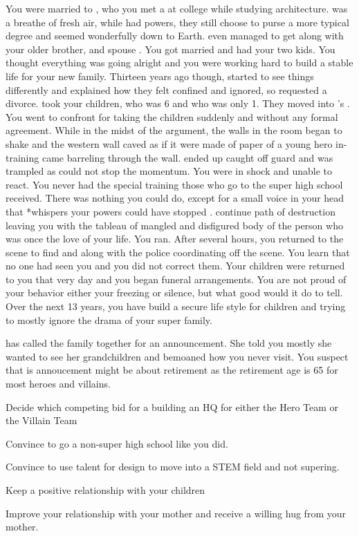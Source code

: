 \documentclass[char]{LRSguildcamp1}
\begin{document}
You were married to \cAS{}, who you met a at college while studying architecture. \cAS{} was a breathe of fresh air, while \cAS{\they} had powers, they still choose to purse a more typical degree and seemed wonderfully down to Earth. \cAS{} even managed to get along with your older brother, \cOldest{} and \cOldest{\their} spouse \cOS{}. You got married and had your two kids. You thought everything was going alright and you were working hard to build a stable life for your new family.  Thirteen years ago though, \cAS{} started to see things differently and \cAS{\they} explained how they felt confined and ignored, so requested a divorce. \cAS{} took your children, \cTeen{} who was 6 and \cTween{} who was only 1. They moved into \cOldest{}'s . You went to confront \cAS{} for taking the children suddenly and without any formal agreement.  While in the midst of the argument, the walls in the room began to shake and the western wall caved as if it were made of paper of a young hero in-training \cJuggernaut{} came barreling through the wall. ended up caught off guard and was trampled as \cJuggernaut{} could not stop the momentum. You were in shock and unable to react. You never had the special training those who go to the super high school received. There was nothing you could do, except for a small voice in your head that *whispers your powers could have stopped \cJuggernaut{}. \cJuggernaut{} continue  path of destruction leaving you with the tableau of mangled and disfigured body of the person who was once the love of your life. You ran. After several hours, you returned to the scene to find \cOS{} and \cOldest{} along with the police coordinating off the scene. You learn that no one had seen you and you did not correct them. Your children were returned to you that very day and you began funeral arrangements. You are not proud of your behavior either your freezing or silence, but what good would it do to tell. Over the next 13 years, you have build a secure life style for children and trying to mostly ignore the drama of your super family. 

\cGrandma{} has called the family together for an announcement. She told you mostly she wanted to see her grandchildren and bemoaned how you never visit.  You suspect that is annoucement might be about \cGrandma{\their} retirement as the retirement age is 65 for most heroes and villains.  


\begin{itemz}[Goals]
	\item Decide which competing bid for a building an HQ for either the Hero Team or the Villain Team
	\item Convince \cTween{} to go a non-super high school like you did.  
	\item Convince \cTeen{} to use \cTeen{\their} talent for design to move into a STEM field and not supering.
	\item Keep a positive relationship with your children
	\item Improve your relationship with your mother and receive a willing hug from your mother.  
	\end{itemz}
\end{document}
